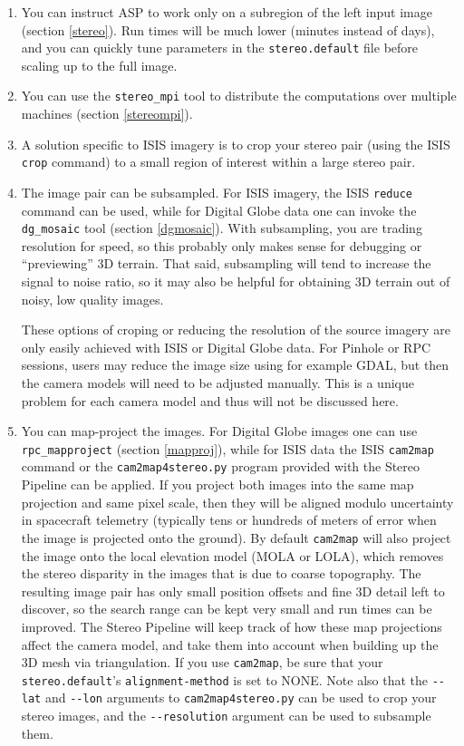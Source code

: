 \begin{enumerate}

\item You can instruct ASP to work only on a subregion of the left input
image (section \ref{stereo}). Run times will be much lower (minutes
instead of days), and you can quickly tune parameters in the
\texttt{stereo.default} file before scaling up to the full image.

\item You can use the \texttt{stereo\_mpi} tool to distribute the
  computations over multiple machines (section \ref{stereompi}).

\item A solution specific to ISIS imagery is to crop your stereo pair
(using the ISIS \texttt{crop} command) to a small region of interest
within a large stereo pair.

\item The image pair can be subsampled. For ISIS imagery, the ISIS
\texttt{reduce} command can be used, while for Digital Globe data one
can invoke the \texttt{dg\_mosaic} tool (section \ref{dgmosaic}). With
subsampling, you are trading resolution for speed, so this probably only
makes sense for debugging or ``previewing'' 3D terrain. That said,
subsampling will tend to increase the signal to noise ratio, so it may
also be helpful for obtaining 3D terrain out of noisy, low quality images.

These options of croping or reducing the resolution of the source
imagery are only easily achieved with ISIS or Digital Globe data. For
Pinhole or RPC sessions, users may reduce the image size using for
example GDAL, but then the camera models will need to be adjusted
manually. This is a unique problem for each camera model and thus will
not be discussed here.

\item You can map-project the images. For Digital Globe images one can
  use \texttt{rpc\_mapproject} (section \ref{mapproj}), while for ISIS
  data the ISIS \texttt{cam2map} command or the \texttt{cam2map4stereo.py} program
provided with the Stereo Pipeline can be applied. If you project both images into the
same map projection and same pixel scale, then they will be aligned
modulo uncertainty in spacecraft telemetry (typically tens or hundreds
of meters of error when the image is projected onto the ground).  By default
\texttt{cam2map} will also project the image onto the local elevation
model (MOLA or LOLA), which removes the stereo disparity in the images
that is due to coarse topography.  The resulting image pair has only
small position offsets and fine 3D detail left to discover, so the
search range can be kept very small and run times can be improved.
The Stereo Pipeline will keep track of how these map
projections affect the camera model, and take them into account when
building up the 3D mesh via triangulation.  If you use \texttt{cam2map},
be sure that your \texttt{stereo.default}'s \texttt{alignment-method} is
set to NONE.  Note also that the \texttt{-\/-lat} and \texttt{-\/-lon}
arguments to \texttt{cam2map4stereo.py} can be used to crop your stereo
images, and the \texttt{-\/-resolution} argument can be used to
subsample them.
\end{enumerate}


